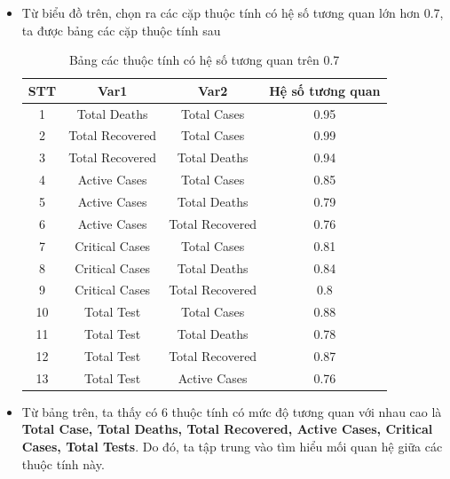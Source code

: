 \documentclass[a4paper, 12pt]{article}
\begin{document}
\begin{itemize}
        \item Từ biểu đồ trên, chọn ra các cặp thuộc tính có hệ số tương quan lớn hơn 0.7, ta được bảng các cặp thuộc tính sau
        \begin{table}[H]
            \begin{center}
                \begin{tabular}{|c|c|c|c|}
                \hline
                \textbf{STT} & \textbf{Var1} & \textbf{Var2} & \textbf{Hệ số tương quan} \\ \hline
                1    &  Total Deaths     &  Total Cases    & 0.95                 \\ \hline
                2    &  Total Recovered  & Total Cases     & 0.99                 \\ \hline
                3    &  Total Recovered  & Total Deaths    & 0.94                 \\ \hline
                4    &  Active Cases     & Total Cases     & 0.85                 \\ \hline
                5    &  Active Cases     & Total Deaths    & 0.79                 \\ \hline
                6    &  Active Cases     & Total Recovered & 0.76                 \\ \hline
                7    &  Critical Cases   & Total Cases     & 0.81                 \\ \hline
                8    &  Critical Cases   & Total Deaths    & 0.84                 \\ \hline
                9    &  Critical Cases   & Total Recovered & 0.8                 \\ \hline
                10   &  Total Test       & Total Cases     & 0.88                 \\ \hline
                11   &  Total Test       & Total Deaths    & 0.78                 \\ \hline
                12   &  Total Test       & Total Recovered & 0.87                 \\ \hline
                13   &  Total Test       & Active Cases    & 0.76                 \\ \hline
                \end{tabular}
                \caption{Bảng các thuộc tính có hệ số tương quan trên 0.7}
            \end{center}
        \end{table}

        \item Từ bảng trên, ta thấy có 6 thuộc tính có mức độ tương quan với nhau cao là \textbf{Total Case, Total Deaths, Total Recovered, Active Cases, Critical Cases, Total Tests}. Do đó, ta tập trung vào tìm hiểu mối quan hệ giữa các thuộc tính này.
    \end{itemize}
\end{document}
